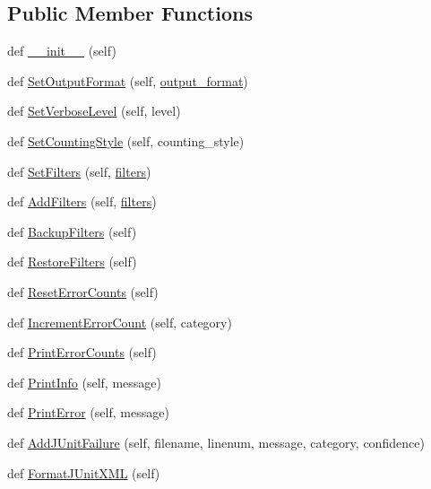 \subsection*{Public Member Functions}
\begin{DoxyCompactItemize}
\item 
def \hyperlink{classcpplint_1_1___cpp_lint_state_a9cc2db6b8d2e3b757fc48fb3c2fd4d8b}{\+\_\+\+\_\+init\+\_\+\+\_\+} (self)
\item 
def \hyperlink{classcpplint_1_1___cpp_lint_state_ab43553d2e2027b58d08a7001c71c0902}{Set\+Output\+Format} (self, \hyperlink{classcpplint_1_1___cpp_lint_state_a5c68ca79b0ff9b2fba1c488a7b2bd3f0}{output\+\_\+format})
\item 
def \hyperlink{classcpplint_1_1___cpp_lint_state_ad4f97c907cc79e8d60237d0327830588}{Set\+Verbose\+Level} (self, level)
\item 
def \hyperlink{classcpplint_1_1___cpp_lint_state_ac2503f2d8a357edd3ca648d219c7317e}{Set\+Counting\+Style} (self, counting\+\_\+style)
\item 
def \hyperlink{classcpplint_1_1___cpp_lint_state_a359d4516eac0c1dce6223cf18181ac80}{Set\+Filters} (self, \hyperlink{classcpplint_1_1___cpp_lint_state_a8443105b9623383ab75fa242009c006e}{filters})
\item 
def \hyperlink{classcpplint_1_1___cpp_lint_state_a248c70895572f2468d3c842faff2f285}{Add\+Filters} (self, \hyperlink{classcpplint_1_1___cpp_lint_state_a8443105b9623383ab75fa242009c006e}{filters})
\item 
def \hyperlink{classcpplint_1_1___cpp_lint_state_a2444e784910e03681de22f43d4077dd1}{Backup\+Filters} (self)
\item 
def \hyperlink{classcpplint_1_1___cpp_lint_state_a7a9c9fdfe033ebe1933450b4ae524598}{Restore\+Filters} (self)
\item 
def \hyperlink{classcpplint_1_1___cpp_lint_state_ab802596abd5fba5e290e090388b6842a}{Reset\+Error\+Counts} (self)
\item 
def \hyperlink{classcpplint_1_1___cpp_lint_state_a27a33a5049850d52cc8aef3478ca445a}{Increment\+Error\+Count} (self, category)
\item 
def \hyperlink{classcpplint_1_1___cpp_lint_state_a3149156b00f8d53e5625256e3df2b4f0}{Print\+Error\+Counts} (self)
\item 
def \hyperlink{classcpplint_1_1___cpp_lint_state_ae1b60a4c3b0913b9897a7876e4527ed3}{Print\+Info} (self, message)
\item 
def \hyperlink{classcpplint_1_1___cpp_lint_state_ad89cb7cbef4b3b4c5f12e3cdc100c7a4}{Print\+Error} (self, message)
\item 
def \hyperlink{classcpplint_1_1___cpp_lint_state_a82f8ae70ccd4fd1866bfc489c489dc13}{Add\+J\+Unit\+Failure} (self, filename, linenum, message, category, confidence)
\item 
def \hyperlink{classcpplint_1_1___cpp_lint_state_a7a2f9c080fba9804028d1366bf338a06}{Format\+J\+Unit\+X\+ML} (self)
\end{DoxyCompactItemize}

